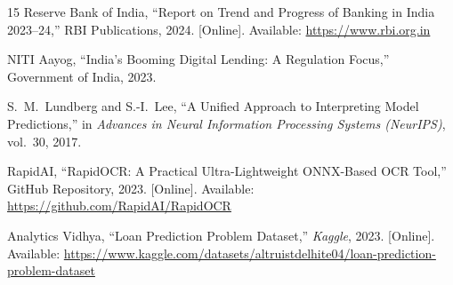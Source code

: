 \documentclass[conference]{IEEEtran}
\begin{document}
\begin{thebibliography}{15}
Reserve Bank of India, ``Report on Trend and Progress of
Banking in India 2023--24,'' RBI Publications, 2024.
[Online]. Available: \url{https://www.rbi.org.in}

NITI Aayog, ``India's Booming Digital Lending: A
Regulation Focus,'' Government of India, 2023.

S.\ M.\ Lundberg and S.-I.\ Lee, ``A Unified Approach to
Interpreting Model Predictions,'' in \textit{Advances in
Neural Information Processing Systems (NeurIPS)},
vol.\ 30, 2017.

RapidAI, ``RapidOCR: A Practical Ultra-Lightweight
ONNX-Based OCR Tool,'' GitHub Repository, 2023.
[Online]. Available: \url{https://github.com/RapidAI/RapidOCR}

Analytics Vidhya, ``Loan Prediction Problem Dataset,''
\textit{Kaggle}, 2023.
[Online]. Available: \url{https://www.kaggle.com/datasets/altruistdelhite04/loan-prediction-problem-dataset}

\end{thebibliography}
\end{document}
